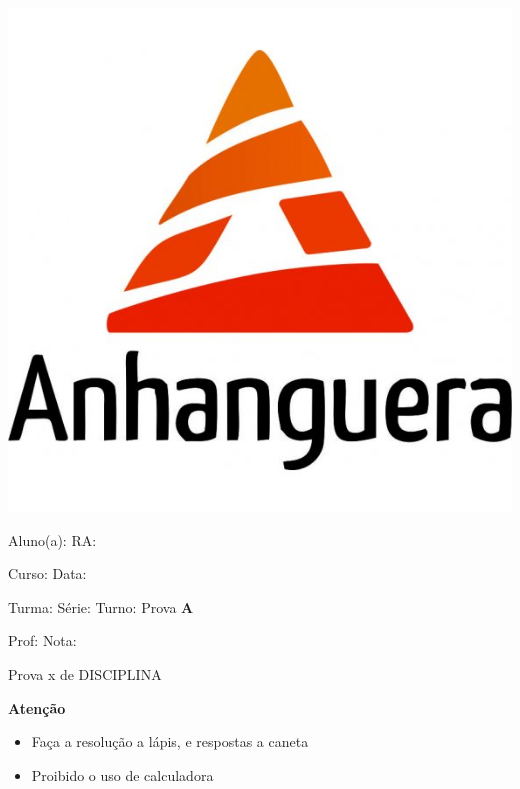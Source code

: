 \documentclass[a4paper]{article}
\begin{document}
\noindent\parbox[c]{.15\textwidth}{\includegraphics[width=.15\textwidth]{logo}}\hfill
\parbox[c]{.825\textwidth}{\raggedright%
{Aluno(a): \underline{\hspace{8.5cm}} RA: \underline{\hspace{2.3cm}}\par}
{Curso: \underline{\hspace{8.95cm}} Data: \underline{\hspace{2cm}}\par}
{Turma: \underline{\hspace{2cm}} Série: \underline{\hspace{2cm}}
  Turno: \underline{\hspace{2.5cm}} Prova {\bf A}\par}
{Prof: \underline{\hspace{9.15cm}} Nota: \underline{\hspace{2cm}}\par}

\vspace{10pt}
}

{\large Prova x de DISCIPLINA}

\vspace{10pt}


\hrulefill

{\bf Atenção}

\begin{itemize}
\item Faça a resolução a lápis, e respostas a caneta
\item Proibido o uso de calculadora
\end{itemize}
\end{document}
